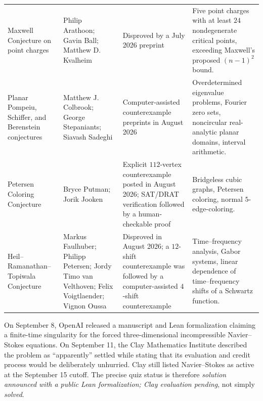 {\begin{longtable}{@{}L{0.25\textwidth}L{0.22\textwidth}L{0.18\textwidth}L{0.27\textwidth}@{}}
        Maxwell Conjecture on point charges
        & Philip Arathoon; Gavin Ball; Matthew D. Kvalheim
        & Disproved by a July 2026 preprint
        & Five point charges with at least $24$ nondegenerate critical points,
          exceeding Maxwell's proposed $(n-1)^2$ bound. \\

        Planar Pompeiu, Schiffer, and Berenstein conjectures
        & Matthew J. Colbrook; George Stepaniants; Siavash Sadeghi
        & Computer-assisted counterexample preprints in August 2026
        & Overdetermined eigenvalue problems, Fourier zero sets, noncircular
          real-analytic planar domains, interval arithmetic. \\

        Petersen Coloring Conjecture
        & Bryce Putman; Jorik Jooken
        & Explicit $112$-vertex counterexample posted in August 2026; SAT/DRAT
          verification followed by a human-checkable proof
        & Bridgeless cubic graphs, Petersen coloring, normal $5$-edge-coloring. \\

        Heil--Ramanathan--Topiwala Conjecture
        & Markus Faulhuber; Philipp Petersen; Jordy Timo van Velthoven; Felix
          Voigtlaender; Vignon Oussa
        & Disproved in August 2026; a $12$-shift counterexample was followed by
          a computer-assisted $4$-shift counterexample
        & Time--frequency analysis, Gabor systems, linear dependence of
          time--frequency shifts of a Schwartz function. \\

    \end{longtable}
    }

    \begin{fact}
        On September 8, OpenAI released a manuscript and Lean formalization
        claiming a finite-time singularity for the forced three-dimensional
        incompressible Navier--Stokes equations. On September 11, the Clay
        Mathematics Institute described the problem as ``apparently'' settled
        while stating that its evaluation and credit process would be
        deliberately unhurried. Clay still listed Navier--Stokes as active at
        the September 15 cutoff. The precise quiz status is therefore
        \emph{solution announced with a public Lean formalization; Clay evaluation
        pending}, not simply \emph{solved}.
    \end{fact}

